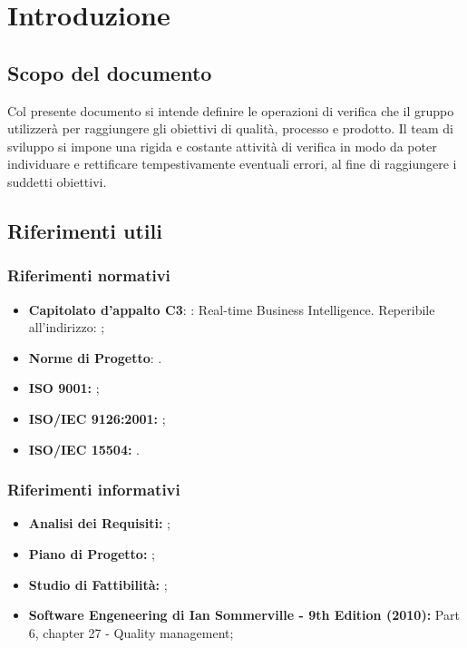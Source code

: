 
\section{Introduzione}
	
	\subsection{Scopo del documento}
		Col presente documento si intende definire le operazioni di verifica che il gruppo \groupname{} utilizzerà per raggiungere gli obiettivi di qualità, processo e prodotto. Il team di sviluppo si impone una rigida e costante attività di verifica in modo da poter individuare e rettificare tempestivamente eventuali errori, al fine di raggiungere i suddetti obiettivi. 
	
	

	\subsection{Riferimenti utili}
		

		\subsubsection{Riferimenti normativi}
			\begin{itemize}
				\item \textbf{Capitolato d'appalto C3}: \projectname{}: Real-time Business Intelligence. Reperibile all'indirizzo: ;
				\item \textbf{Norme di Progetto}: .
				\item \textbf{ISO 9001:} ;
				\item \textbf{ISO/IEC 9126:2001:} ;
				\item \textbf{ISO/IEC 15504:} .
			\end{itemize}
		

		\subsubsection{Riferimenti informativi}
			\begin{itemize}
				\item \textbf{Analisi dei Requisiti:} ;
				\item \textbf{Piano di Progetto:} ;
				\item \textbf{Studio di Fattibilità:} ;
				\item \textbf{Software Engeneering di Ian Sommerville - 9th Edition (2010):} Part 6, chapter 27 - Quality management;
			\end{itemize}

